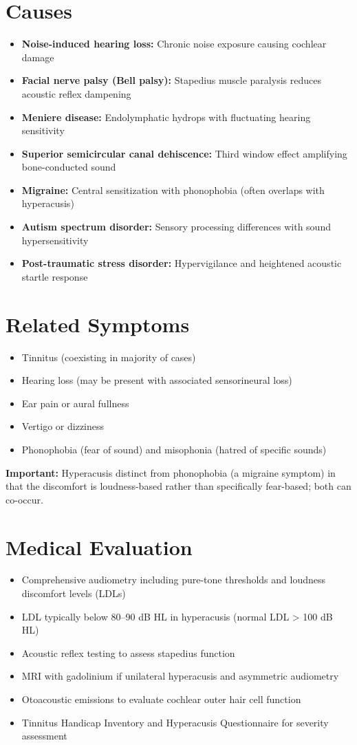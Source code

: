 \section*{Causes}
\begin{itemize}
  \item \textbf{Noise-induced hearing loss:} Chronic noise exposure causing cochlear damage
  \item \textbf{Facial nerve palsy (Bell palsy):} Stapedius muscle paralysis reduces acoustic reflex dampening
  \item \textbf{Meniere disease:} Endolymphatic hydrops with fluctuating hearing sensitivity
  \item \textbf{Superior semicircular canal dehiscence:} Third window effect amplifying bone-conducted sound
  \item \textbf{Migraine:} Central sensitization with phonophobia (often overlaps with hyperacusis)
  \item \textbf{Autism spectrum disorder:} Sensory processing differences with sound hypersensitivity
  \item \textbf{Post-traumatic stress disorder:} Hypervigilance and heightened acoustic startle response
\end{itemize}

\section*{Related Symptoms}
\begin{itemize}
  \item Tinnitus (coexisting in majority of cases)
  \item Hearing loss (may be present with associated sensorineural loss)
  \item Ear pain or aural fullness
  \item Vertigo or dizziness
  \item Phonophobia (fear of sound) and misophonia (hatred of specific sounds)
\end{itemize}
\textbf{Important:} Hyperacusis distinct from phonophobia (a migraine symptom) in that the discomfort is loudness-based rather than specifically fear-based; both can co-occur.

\section*{Medical Evaluation}
\begin{itemize}
  \item Comprehensive audiometry including pure-tone thresholds and loudness discomfort levels (LDLs)
  \item LDL typically below 80--90 dB HL in hyperacusis (normal LDL > 100 dB HL)
  \item Acoustic reflex testing to assess stapedius function
  \item MRI with gadolinium if unilateral hyperacusis and asymmetric audiometry
  \item Otoacoustic emissions to evaluate cochlear outer hair cell function
  \item Tinnitus Handicap Inventory and Hyperacusis Questionnaire for severity assessment
\end{itemize}

